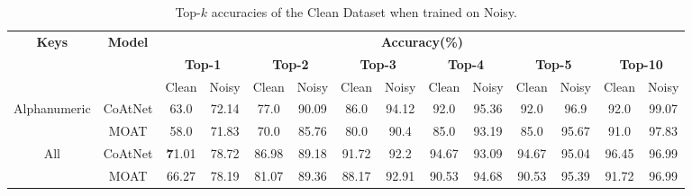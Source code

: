 \documentclass[a4paper,11pt,twoside]{report}
\theoremstyle{definition}
\begin{document}
\begin{table}[h!]
\centering
\caption{Top-$k$ accuracies of the Clean Dataset when trained on Noisy.}
\begin{adjustbox}{max width=\textwidth}
\begin{tabular}{c|c|c c | c c | c c | c c | c c | c c}
\hline
\textbf{Keys} & \textbf{Model} & \multicolumn{12}{c}{\textbf{Accuracy(\%)}} \\
\cline{3-14}
& & \multicolumn{2}{c|}{\textbf{Top-1}} & \multicolumn{2}{c|}{\textbf{Top-2}} & \multicolumn{2}{c|}{\textbf{Top-3}} & \multicolumn{2}{c|}{\textbf{Top-4}} & \multicolumn{2}{c|}{\textbf{Top-5}} & \multicolumn{2}{c}{\textbf{Top-10}} \\
\cline{3-14}
& & Clean & Noisy & Clean & Noisy & Clean & Noisy & Clean & Noisy & Clean & Noisy & Clean & Noisy \\
\hline
\multirow{2}{*}{Alphanumeric} & CoAtNet & 63.0 & 72.14 & 77.0 & 90.09 & 86.0 & 94.12 &  92.0 & 95.36 & 92.0 & 96.9 & 92.0 & 99.07\\
                              & MOAT & 58.0 & 71.83 & 70.0 & 85.76 & 80.0 & 90.4 &  85.0 & 93.19 & 85.0  & 95.67& 91.0 & 97.83\\
\hline
\multirow{2}{*}{All} & CoAtNet  & \textbf71.01 & 78.72 & 86.98 & 89.18 & 91.72 & 92.2 & 94.67 & 93.09 & 94.67 & 95.04 & 96.45 & 96.99 \\
                    & MOAT    & 66.27 & 78.19 & 81.07 & 89.36 & 88.17 & 92.91 & 90.53 & 94.68 & 90.53 & 95.39 & 91.72 & 96.99 \\

\hline
\end{tabular}
\end{adjustbox}
\label{tab:topk_noisy_train}
\end{table}
\end{document}
